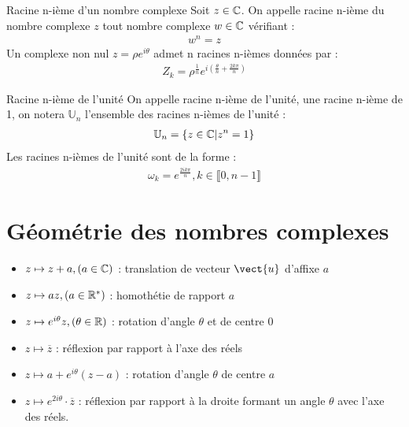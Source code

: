 \begin{definition}{Racine n-ième d'un nombre complexe}
    Soit $z \in \mathbb{C}$. On appelle racine n-ième du nombre complexe $z$ tout nombre complexe $w \in \mathbb{C}$ vérifiant :
    \begin{align*}
        w^n = z
    \end{align*}
    Un complexe non nul $z = \rho e^{i\theta}$ admet n racines n-ièmes données par :
    \begin{align*}
        Z_k = \rho^{\frac{1}{n}} e^{i\left(\frac{\theta}{n} + \frac{2k\pi}{n} \right)} 
    \end{align*}
\end{definition}

\begin{definition}{Racine n-ième de l'unité}
    On appelle racine n-ième de l'unité, une racine n-ième de 1, on notera $\mathbb{U}_n$ l'ensemble des racines n-ièmes de l'unité :
    \begin{align*}
        \mathbb{U}_n = \{z \in \mathbb{C} | z^n = 1 \}
    \end{align*}
    Les racines n-ièmes de l'unité sont de la forme :
    \begin{align*}
        \omega_k = e^{\frac{2ik\pi}{n}}, k \in \llbracket 0, n - 1 \rrbracket
    \end{align*}
\end{definition}

\section{Géométrie des nombres complexes}
\begin{itemize}
    \item $z \mapsto z + a, (a \in \mathbb{C})$ : translation de vecteur $\vect{u}$ d'affixe $a$
    \item $z \mapsto az, (a \in \mathbb{R}^*)$ : homothétie de rapport $a$
    \item $z \mapsto e^{i\theta}z, (\theta \in \mathbb{R})$ : rotation d'angle $\theta$ et de centre $0$
    \item $z \mapsto \overline{z}$ : réflexion par rapport à l'axe des réels
    \item $z \mapsto a + e^{i\theta} (z - a)$ : rotation d'angle $\theta$ de centre $a$
    \item $z \mapsto e^{2i\theta} \cdot \overline{z}$ : réflexion par rapport à la droite formant un angle $\theta$ avec l'axe des réels.
\end{itemize}

